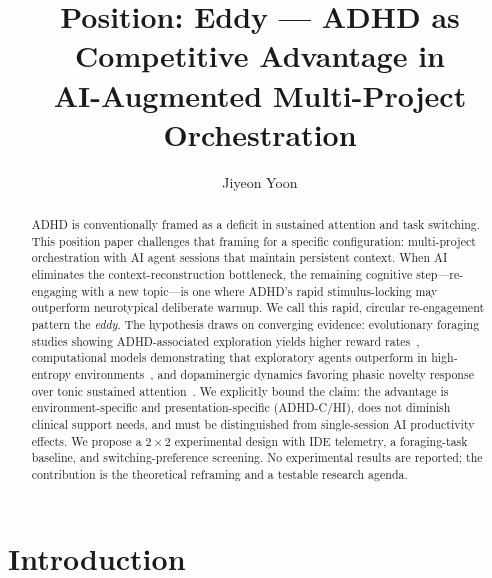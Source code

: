 \documentclass[sigconf,nonacm]{acmart}
\begin{document}
\title{Position: Eddy --- ADHD as Competitive Advantage in\\AI-Augmented Multi-Project Orchestration}

\author{Jiyeon Yoon}

\begin{abstract}
ADHD is conventionally framed as a deficit in sustained attention and task switching. This position paper challenges that framing for a specific configuration: multi-project orchestration with AI agent sessions that maintain persistent context. When AI eliminates the context-reconstruction bottleneck, the remaining cognitive step---re-engaging with a new topic---is one where ADHD's rapid stimulus-locking may outperform neurotypical deliberate warmup. We call this rapid, circular re-engagement pattern the \emph{eddy}. The hypothesis draws on converging evidence: evolutionary foraging studies showing ADHD-associated exploration yields higher reward rates~\cite{barack2024}, computational models demonstrating that exploratory agents outperform in high-entropy environments~\cite{meredith2025}, and dopaminergic dynamics favoring phasic novelty response over tonic sustained attention~\cite{grace2001, badgaiyan2015}. We explicitly bound the claim: the advantage is environment-specific and presentation-specific (ADHD-C/HI), does not diminish clinical support needs, and must be distinguished from single-session AI productivity effects. We propose a $2 \times 2$ experimental design with IDE telemetry, a foraging-task baseline, and switching-preference screening. No experimental results are reported; the contribution is the theoretical reframing and a testable research agenda.
\end{abstract}


\maketitle

\section{Introduction}
\end{document}
